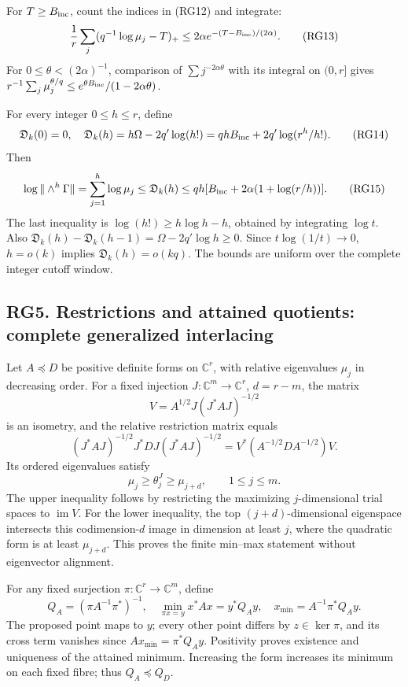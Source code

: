 \documentclass[11pt]{article}
\begin{document}
For \(T\ge B_{\rm inc}\), count the indices in (RG12) and integrate: \[
{1\over r}\sum_j(q^{-1}\log\mu_j-T)_+
\le2\alpha e^{-(T-B_{\rm inc})/(2\alpha)}.
\tag{RG13}
\] For \(0\le\theta<(2\alpha)^{-1}\), comparison of \(\sum j^{-2\alpha\theta}\) with its integral on \((0,r]\) gives \(r^{-1}\sum_j\mu_j^{\theta/q}\le e^{\theta B_{\rm inc}}/(1-2\alpha\theta)\).

For every integer \(0\le h\le r\), define \[
\mathfrak D_k(0)=0,\quad
\mathfrak D_k(h)=h\Omega-2q'\log(h!)
=qhB_{\rm inc}+2q'\log(r^h/h!).
\tag{RG14}
\] Then \[
\log\|\wedge^h\Gamma\|=\sum_{j=1}^h\log\mu_j
\le\mathfrak D_k(h)
\le qh[B_{\rm inc}+2\alpha(1+\log(r/h))].
\tag{RG15}
\] The last inequality is \(\log(h!)\ge h\log h-h\), obtained by integrating \(\log t\). Also \(\mathfrak D_k(h)-\mathfrak D_k(h-1)=\Omega-2q'\log h\ge0\). Since \(t\log(1/t)\to0\), \(h=o(k)\) implies \(\mathfrak D_k(h)=o(kq)\). The bounds are uniform over the complete integer cutoff window.

\subsection{RG5. Restrictions and attained quotients: complete generalized interlacing}\label{rg5.-restrictions-and-attained-quotients-complete-generalized-interlacing}

Let \(A\preceq D\) be positive definite forms on \(\mathbb C^r\), with relative eigenvalues \(\mu_j\) in decreasing order. For a fixed injection \(J:\mathbb C^m\to\mathbb C^r\), \(d=r-m\), the matrix \[
V=A^{1/2}J(J^*AJ)^{-1/2}
\] is an isometry, and the relative restriction matrix equals \[
(J^*AJ)^{-1/2}J^*DJ(J^*AJ)^{-1/2}
=V^*(A^{-1/2}DA^{-1/2})V.
\] Its ordered eigenvalues satisfy \[
\mu_j\ge\theta_j^J\ge\mu_{j+d},\qquad1\le j\le m.
\tag{RG16}
\] The upper inequality follows by restricting the maximizing \(j\)-dimensional trial spaces to \(\operatorname{im}V\). For the lower inequality, the top \((j+d)\)-dimensional eigenspace intersects this codimension-\(d\) image in dimension at least \(j\), where the quadratic form is at least \(\mu_{j+d}\). This proves the finite min--max statement without eigenvector alignment.

For any fixed surjection \(\pi:\mathbb C^r\to\mathbb C^m\), define \[
Q_A=(\pi A^{-1}\pi^*)^{-1},\quad
\min_{\pi x=y}x^*Ax=y^*Q_Ay,\quad
x_{\min}=A^{-1}\pi^*Q_Ay.
\tag{RG17}
\] The proposed point maps to \(y\); every other point differs by \(z\in\ker\pi\), and its cross term vanishes since \(Ax_{\min}=\pi^*Q_Ay\). Positivity proves existence and uniqueness of the attained minimum. Increasing the form increases its minimum on each fixed fibre; thus \(Q_A\preceq Q_D\).
\end{document}
